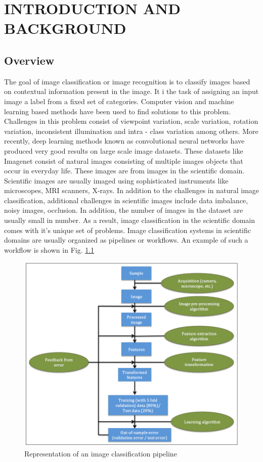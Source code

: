 \chapter{INTRODUCTION AND BACKGROUND}
\label{chap:intro}

\section{Overview}
The goal of image classification or image recognition is to classify images based on contextual information present in the image. It i the task of assigning an input image a label from a fixed set of categories. Computer vision and machine learning based methods have been used to find solutions to this problem. Challenges in this problem consist of viewpoint variation, scale variation, rotation variation, inconsistent illumination and intra - class variation among others. More recently, deep learning methods known as convolutional neural networks have produced very good results on large scale image datasets. These datasets like Imagenet \cite{deng2009imagenet} consist of natural images consisting of multiple images objects that occur in everyday life. These images are from images in the scientific domain. Scientific images are usually imaged using sophisticated instruments like microscopes, MRI scanners, X-rays. In addition to the challenges in natural image classification, additional challenges in scientific images include data imbalance, noisy images, occlusion. In addition, the number of images in the dataset are usually small in number. As a result, image classification in the scientific domain comes with it's unique set of problems. 
Image classification systems in scientific domains are usually organized as pipelines or workflows. An example of such a workflow is shown in Fig.  \ref{fig:flowchart1}

\begin{figure}[H]
    \centering
    \includegraphics[scale=0.5]{img/EP/flowchart}
    \caption{Representation of an image classification pipeline}
\label{fig:flowchart1}
\end{figure}

